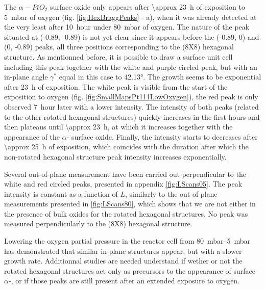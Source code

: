 The ${\alpha-PtO_2}$ surface oxide only appears after \qty{\approx 23}{\hour} of exposition to \qty{5}{\milli\bar} of oxygen (fig. \ref{fig:HexBraggPeaks} - a), when it was already detected at the very least after \qty{10}{hour} under \qty{80}{\milli\bar} of oxygen.
The nature of the peak situated at (-0.89, -0.89) is not yet clear since it appears before the (-0.89, 0) and (0, -0.89) peaks, all three positions corresponding to the (8X8) hexagonal structure.
As mentionned before, it is possible to draw a surface unit cell including this peak together with the white and purple circled peak, but with an in-plane angle $\gamma^*$ equal in this case to \ang{42.13}.
The growth seems to be exponential after \qty{23}{\hour} of exposition.
The white peak is visible from the start of the exposition to oxygen (fig. \ref{fig:SmallMapsPt111LowOxygen}), the red peak is only observed \qty{7}{hour} later with a lower intensity.
The intensity of both peaks (related to the other rotated hexagonal structures) quickly increases in the first hours and then plateaus until \qty{\approx 23}{\hour}, at which it increases together with the appearance of the $\alpha$- surface oxide.
Finally, the intensity starts to decreases after \qty{\approx 25}{\hour} of exposition, which coincides with the duration after which the non-rotated hexagonal structure peak intensity increases exponentially.

Several out-of-plane measurement have been carried out perpendicular to the white and red circled peaks, presented in appendix \ref{fig:LScans05}.
The peak intensity is constant as a function of $L$, similarly to the out-of-plane measurements presented in \ref{fig:LScans80}, which shows that we are not either in the presence of bulk oxides for the rotated hexagonal structures.
No peak was measured perpendicularly to the (8X8) hexagonal structure.

Lowering the oxygen partial pressure in the reactor cell from \qtyrange{80}{5}{\milli\bar} has demonstrated that similar in-plane structures appear, but with a slower growth rate.
Additionnal studies are needed understand if wether or not the rotated hexagonal structures act only as precursors to the appearance of surface $\alpha$-, or if those peaks are still present after an extended exposure to oxygen.


